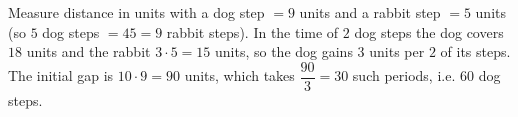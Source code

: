 Measure distance in units with a dog step $=9$ units and a rabbit step $=5$ units (so $5$ dog steps $=45=9$ rabbit steps). In the time of $2$ dog steps the dog covers $18$ units and the rabbit $3\cdot5=15$ units, so the dog gains $3$ units per $2$ of its steps. The initial gap is $10\cdot9=90$ units, which takes $\dfrac{90}{3}=30$ such periods, i.e. $\boxed{60}$ dog steps.
